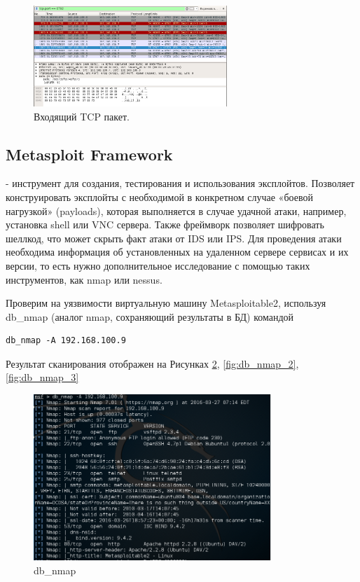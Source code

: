 \documentclass[10pt,a4paper]{article}
\begin{document}
\begin{figure}[h]
\begin{center}
\includegraphics[width=0.65\textwidth]{wireshark_2}
\caption{Входящий TCP пакет.}
\label{fig:wireshark_2}
\end{center}
\end{figure}

\subsection{Metasploit Framework}
\label{msf}

- инструмент для создания, тестирования и использования эксплойтов. Позволяет конструировать эксплойты с необходимой в конкретном случае «боевой нагрузкой» (payloads), которая выполняется в случае удачной атаки, например, установка shell или VNC сервера. Также фреймворк позволяет шифровать шеллкод, что может скрыть факт атаки от IDS или IPS. Для проведения атаки необходима информация об установленных на удаленном сервере сервисах и их версии, то есть нужно дополнительное исследование с помощью таких инструментов, как nmap или nessus.

Проверим на уязвимости виртуальную машину Metasploitable2, используя db\_nmap (аналог nmap, сохраняющий результаты в БД) командой

\begin{verbatim}
db_nmap -A 192.168.100.9
\end{verbatim}

Результат сканирования отображен на Рисунках \ref{fig:db_nmap_1}, \ref{fig:db_nmap_2}, \ref{fig:db_nmap_3}

\begin{figure}[h]
\begin{center}
\includegraphics[width=0.8\textwidth]{db_nmap_1}
\caption{db\_nmap}
\label{fig:db_nmap_1}
\end{center}
\end{figure}
\end{document}
